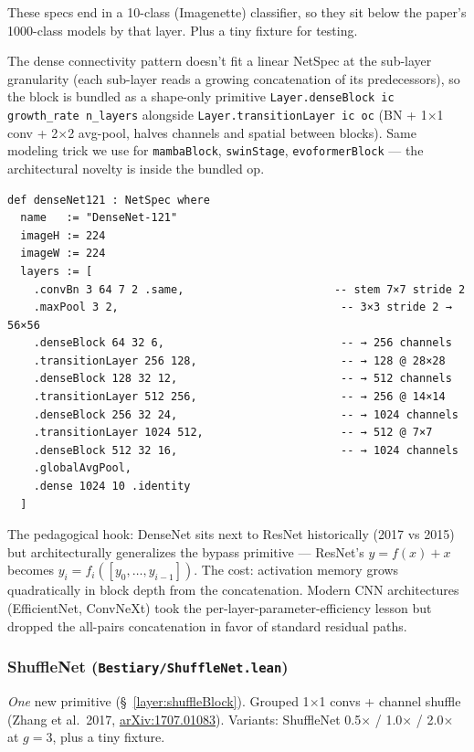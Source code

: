 These specs end in a 10-class (Imagenette) classifier, so they sit below
the paper's 1000-class models by that layer. Plus a tiny fixture for
testing.

The dense connectivity pattern doesn't fit a linear NetSpec at the
sub-layer granularity (each sub-layer reads a growing concatenation of
its predecessors), so the block is bundled as a shape-only primitive
\texttt{Layer.denseBlock ic growth\_rate n\_layers} alongside
\texttt{Layer.transitionLayer ic oc} (BN + 1$\times$1 conv +
2$\times$2 avg-pool, halves channels and spatial between blocks).
Same modeling trick we use for \texttt{mambaBlock}, \texttt{swinStage},
\texttt{evoformerBlock} --- the architectural novelty is inside the
bundled op.

\begin{verbatim}
def denseNet121 : NetSpec where
  name   := "DenseNet-121"
  imageH := 224
  imageW := 224
  layers := [
    .convBn 3 64 7 2 .same,                       -- stem 7×7 stride 2
    .maxPool 3 2,                                  -- 3×3 stride 2 → 56×56
    .denseBlock 64 32 6,                           -- → 256 channels
    .transitionLayer 256 128,                      -- → 128 @ 28×28
    .denseBlock 128 32 12,                         -- → 512 channels
    .transitionLayer 512 256,                      -- → 256 @ 14×14
    .denseBlock 256 32 24,                         -- → 1024 channels
    .transitionLayer 1024 512,                     -- → 512 @ 7×7
    .denseBlock 512 32 16,                         -- → 1024 channels
    .globalAvgPool,
    .dense 1024 10 .identity
  ]
\end{verbatim}

The pedagogical hook: DenseNet sits next to ResNet historically (2017
vs 2015) but architecturally generalizes the bypass primitive ---
ResNet's $y = f(x) + x$ becomes $y_i = f_i([y_0, \ldots, y_{i-1}])$.
The cost: activation memory grows quadratically in block depth from
the concatenation. Modern CNN architectures (EfficientNet, ConvNeXt)
took the per-layer-parameter-efficiency lesson but dropped the
all-pairs concatenation in favor of standard residual paths.

\subsubsection*{ShuffleNet (\texttt{Bestiary/ShuffleNet.lean})}
\emph{One} new primitive (\S~\ref{layer:shuffleBlock}). Grouped
1$\times$1 convs + channel shuffle (Zhang et al.\ 2017,
\href{https://arxiv.org/abs/1707.01083}{arXiv:1707.01083}).
Variants: ShuffleNet 0.5$\times$ /
1.0$\times$ / 2.0$\times$ at $g=3$, plus a tiny fixture.

